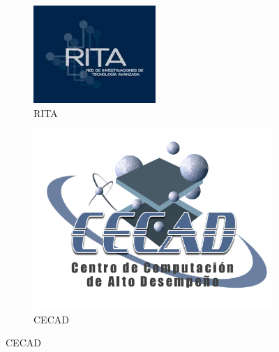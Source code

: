 \documentclass[10pt]{article}   			%
\begin{document}
\begin{figure}[ht]
\centering
\begin{subfigure}[b]{0.4\textwidth}  		%
	\includegraphics[width=\textwidth]{RITA}
	\caption{RITA}
	\label{fig:RITA}
\end{subfigure}
\begin{subfigure}[b]{0.4\textwidth}		 	%
	\includegraphics[width=\textwidth]{CECAD}
	\caption{CECAD}
	\label{fig:CECAD}
\end{subfigure}

\end{figure}
\end{document}
